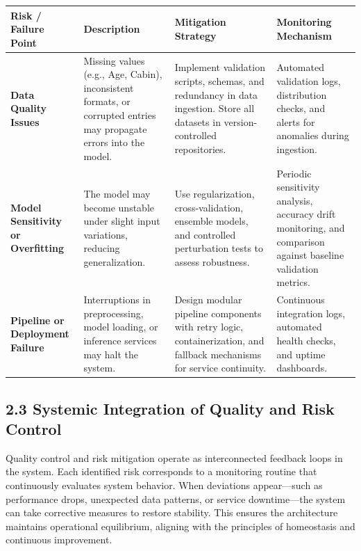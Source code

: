 \documentclass[12pt]{report}
\begin{document}
\begin{center}
\begin{tabular}{|p{3cm}|p{4.5cm}|p{4.5cm}|p{4.5cm}|}
\hline
\textbf{Risk / Failure Point} & \textbf{Description} & \textbf{Mitigation Strategy} & \textbf{Monitoring Mechanism} \\
\hline

\textbf{Data Quality Issues} & 
Missing values (e.g., Age, Cabin), inconsistent formats, or corrupted entries may 
propagate errors into the model. &
Implement validation scripts, schemas, and redundancy in data ingestion. Store all 
datasets in version-controlled repositories. &
Automated validation logs, distribution checks, and alerts for anomalies during 
ingestion. \\

\hline

\textbf{Model Sensitivity or Overfitting} & 
The model may become unstable under slight input variations, reducing generalization. &
Use regularization, cross-validation, ensemble models, and controlled perturbation 
tests to assess robustness. &
Periodic sensitivity analysis, accuracy drift monitoring, and comparison against 
baseline validation metrics. \\

\hline

\textbf{Pipeline or Deployment Failure} &
Interruptions in preprocessing, model loading, or inference services may halt the 
system. &
Design modular pipeline components with retry logic, containerization, and fallback 
mechanisms for service continuity. &
Continuous integration logs, automated health checks, and uptime dashboards. \\

\hline

\end{tabular}
\end{center}

\subsection*{2.3 Systemic Integration of Quality and Risk Control}

Quality control and risk mitigation operate as interconnected feedback loops in the 
system. Each identified risk corresponds to a monitoring routine that continuously 
evaluates system behavior. When deviations appear—such as performance drops, 
unexpected data patterns, or service downtime—the system can take corrective measures 
to restore stability. This ensures the architecture maintains operational equilibrium, 
aligning with the principles of homeostasis and continuous improvement.
\end{document}
